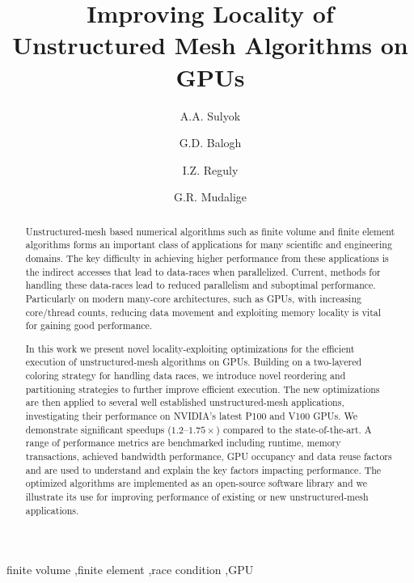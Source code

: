 \documentclass[number]{elsarticle}
\begin{document}
\begin{frontmatter}

  \title{Improving Locality of Unstructured Mesh Algorithms on GPUs}

  \author[1,2]{A.A. Sulyok}
  \author[1,2]{G.D. Balogh}
  \author[1]{I.Z. Reguly}
  \author[3]{G.R. Mudalige}
  \address[1]{
    Faculty of Information Technology and Bionics,
    Pázmány Péter Catholic University,
    Budapest, Hungary
  }
  \address[2]{
    3in-PPCU Research Group,
    Pázmány Péter Catholic University,
    Esztergom, Hungary
  }
   \address[3]{
    Department of Computer Science,
    University of Warwick,
    Coventry, United Kingdom
  }

\begin{abstract}

\noindent Unstructured-mesh based numerical algorithms such as finite volume and 
finite element algorithms forms an important class of applications for many 
scientific and engineering domains. The key difficulty in achieving higher 
performance from these applications is the indirect accesses that lead to 
data-races when parallelized. Current, methods for handling these data-races 
lead to reduced parallelism and suboptimal performance. Particularly on modern 
many-core architectures, such as GPUs, with increasing core/thread counts, 
reducing data movement and exploiting memory locality is vital for gaining good 
performance. 

In this work we present novel locality-exploiting optimizations for the 
efficient execution of unstructured-mesh algorithms on GPUs. Building on a 
two-layered coloring strategy for handling data races, we introduce novel 
reordering and partitioning strategies to further improve efficient execution. 
The new optimizations are then applied to several well established 
unstructured-mesh applications, investigating their performance on NVIDIA's 
latest P100 and V100 GPUs. We demonstrate significant speedups 
($1.2\text{--}1.75\times$) compared to the state-of-the-art. A range of 
performance metrics are benchmarked including runtime, memory transactions, 
achieved bandwidth performance, GPU occupancy and data reuse factors and 
are used to understand and explain the key factors impacting performance. The 
optimized algorithms are implemented as an open-source software library and 
we illustrate its use for improving performance of existing or new 
unstructured-mesh applications.
\end{abstract}

\begin{keyword}
finite volume \sep finite element \sep race condition \sep GPU
\end{keyword}

\end{frontmatter}
\end{document}
